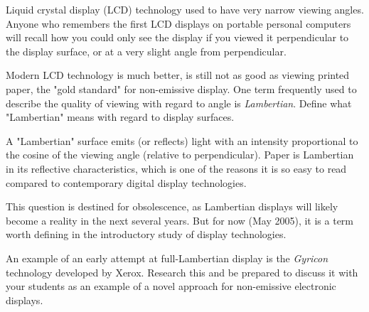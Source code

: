

Liquid crystal display (LCD) technology used to have very narrow viewing angles.  Anyone who remembers the first LCD displays on portable personal computers will recall how you could only see the display if you viewed it perpendicular to the display surface, or at a very slight angle from perpendicular.

Modern LCD technology is much better, is still not as good as viewing printed paper, the "gold standard" for non-emissive display.  One term frequently used to describe the quality of viewing with regard to angle is {\it Lambertian}.  Define what "Lambertian" means with regard to display surfaces.







A "Lambertian" surface emits (or reflects) light with an intensity proportional to the cosine of the viewing angle (relative to perpendicular).  Paper is Lambertian in its reflective characteristics, which is one of the reasons it is so easy to read compared to contemporary digital display technologies.







This question is destined for obsolescence, as Lambertian displays will likely become a reality in the next several years.  But for now (May 2005), it is a term worth defining in the introductory study of display technologies.

An example of an early attempt at full-Lambertian display is the {\it Gyricon} technology developed by Xerox.  Research this and be prepared to discuss it with your students as an example of a novel approach for non-emissive electronic displays.




